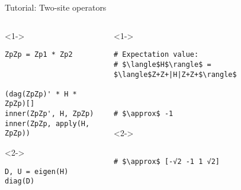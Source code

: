 \begin{frame}[fragile]{Tutorial: Two-site operators}


\begin{columns}

\begin{column}{5cm}

\begin{onlyenv}<1->

\begin{lstlisting}[language=JuliaLocal, style=julia, basicstyle=\small]
ZpZp = Zp1 * Zp2



(dag(ZpZp)' * H * ZpZp)[]
inner(ZpZp', H, ZpZp)
inner(ZpZp, apply(H, ZpZp))
\end{lstlisting}

\end{onlyenv}

\begin{onlyenv}<2->

\begin{lstlisting}[language=JuliaLocal, style=julia, basicstyle=\small]
D, U = eigen(H)
diag(D)
\end{lstlisting}

\end{onlyenv}

\end{column}

\begin{column}{5cm}

\begin{onlyenv}<1->

\begin{lstlisting}[style=julia, numbers=none, mathescape, basicstyle=\small]
# Expectation value:
# $\langle$H$\rangle$ = $\langle$Z+Z+|H|Z+Z+$\rangle$



# $\approx$ -1
 \end{lstlisting}

\end{onlyenv}

\begin{onlyenv}<2->

\begin{lstlisting}[style=julia, numbers=none, mathescape, basicstyle=\small]

# $\approx$ [-√2 -1 1 √2]
\end{lstlisting}

\end{onlyenv}

\end{column}

\end{columns}

\end{frame}
